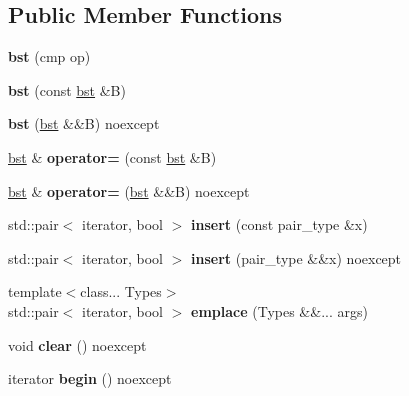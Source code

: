 \subsection*{Public Member Functions}
\begin{DoxyCompactItemize}
\item 
\mbox{\label{classbst_a8d0c20c3ace61d4ffde5ab90fbe3226b}} 
{\bfseries bst} (cmp op)
\item 
\mbox{\label{classbst_a2f94afc86338e90d9110b713383ab492}} 
{\bfseries bst} (const \hyperlink{classbst}{bst} \&B)
\item 
\mbox{\label{classbst_ac0e8f8be6be76d77809ba1d21e1be66a}} 
{\bfseries bst} (\hyperlink{classbst}{bst} \&\&B) noexcept
\item 
\mbox{\label{classbst_a962fce8c5811b3bab57d298b6752481f}} 
\hyperlink{classbst}{bst} \& {\bfseries operator=} (const \hyperlink{classbst}{bst} \&B)
\item 
\mbox{\label{classbst_a3e595b50a147f3c6fe64f1b1514c539d}} 
\hyperlink{classbst}{bst} \& {\bfseries operator=} (\hyperlink{classbst}{bst} \&\&B) noexcept
\item 
\mbox{\label{classbst_aaaeffdb4fae1103a3f6185c74ce43281}} 
std\+::pair$<$ iterator, bool $>$ {\bfseries insert} (const pair\+\_\+type \&x)
\item 
\mbox{\label{classbst_aafe95673b19139abd52e242e5d72b66d}} 
std\+::pair$<$ iterator, bool $>$ {\bfseries insert} (pair\+\_\+type \&\&x) noexcept
\item 
\mbox{\label{classbst_a03e09650b371d423315f26520d6e34a6}} 
{\footnotesize template$<$class... Types$>$ }\\std\+::pair$<$ iterator, bool $>$ {\bfseries emplace} (Types \&\&... args)
\item 
\mbox{\label{classbst_a368b8f209f5158d55374a7cdbd110962}} 
void {\bfseries clear} () noexcept
\item 
\mbox{\label{classbst_a74c68495fd963c501084d129d4c0f5b1}} 
iterator {\bfseries begin} () noexcept

\end{DoxyCompactItemize}
